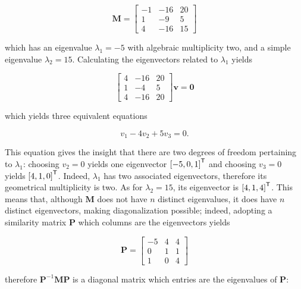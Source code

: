 \begin{equation} \mathbf{M} = \left[\begin{array}{ccc} -1 & -16 & 20 \\[3mm] 1 & -9 & 5 \\[3mm] 4 & -16 & 15\end{array}\right] \label{eq:nonsimple_matrix_example}\end{equation}

	\noindent which has an eigenvalue $\lambda_1 = -5$ with algebraic multiplicity two, and a simple eigenvalue $\lambda_2 = 15$. Calculating the eigenvectors related to $\lambda_1$ yields

\begin{equation} \left[\begin{array}{ccc} 4 & -16 & 20 \\[3mm] 1 & -4 & 5 \\[3mm] 4 & -16 & 20\end{array}\right]\mathbf{v} = \mathbf{0}\end{equation}

	\noindent which yields three equivalent equations

\begin{equation} v_1 - 4v_2 + 5v_3 = 0. \end{equation}

	This equation gives the insight that there are two degrees of freedom pertaining to $\lambda_1$: choosing $v_2 = 0$ yields one eigenvector $\left[-5,0,1\right]^{\mathsf{T}}$ and choosing $v_3 = 0$ yields $\left[4,1,0\right]^{\mathsf{T}}$. Indeed, $\lambda_1$ has two associated eigenvectors, therefore its geometrical multiplicity is two. As for $\lambda_2 = 15$, its eigenvector is $\left[4,1,4\right]^{\mathsf{T}}$. This means that, although $\mathbf{M}$ does not have $n$ distinct eigenvalues, it does have $n$ distinct eigenvectors, making diagonalization possible; indeed, adopting a similarity matrix $\mathbf{P}$ which columns are the eigenvectors yields

\begin{equation} \mathbf{P} = \left[\begin{array}{ccc} -5 & 4 & 4 \\[3mm] 0 & 1 & 1 \\[3mm] 1 & 0 & 4\end{array}\right] \end{equation}

	\noindent therefore $\mathbf{P}^{-1}\mathbf{MP}$ is a diagonal matrix which entries are the eigenvalues of $\mathbf{P}$:

